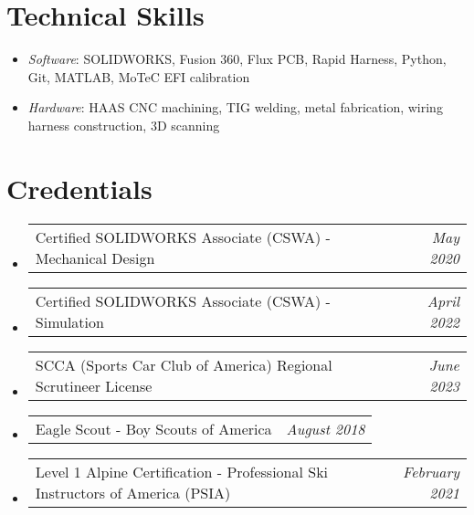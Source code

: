 \documentclass[letterpaper,11pt]{article}
\makeatletter
\newcommand{\role}[2]{
  \vspace{-5pt}\item
  \begin{tabular*}{1.0\textwidth}[t]{l@{\extracolsep{\fill}}r}
    \textit{\small#1} & \textit{\small #2} \\
  \end{tabular*}\vspace{-20pt}
}
\newcommand{\resumeItemListStart}{
  \begin{itemize}[label=\tiny$\bullet$, leftmargin=0.25in] %
}
\newcommand{\resumeItemListEnd}{
  \end{itemize}\vspace{-5pt}
}
\newcommand{\resumeItem}[1]{
  \item\small{#1 \vspace{-2pt}}
}
\newcommand{\credentialListStart}{
  \vspace{-4}
  \begin{itemize}[label=\tiny$\bullet$, leftmargin=0.25in] %
}
\newcommand{\credentialListEnd}{
  \end{itemize}\vspace{-5pt}
}
\newcommand{\credential}[2]{
  \item
  \begin{tabular*}{0.94\textwidth}[t]{l@{\extracolsep{\fill}}r}
    \textnormal{\small#1} & \textit{\small #2} \\
  \end{tabular*}\vspace{-8pt}
}
\makeatother
\begin{document}
            

\section{Technical Skills}
    \resumeItemListStart
        \resumeItem{\textit{Software}{: SOLIDWORKS, Fusion 360, Flux PCB, Rapid Harness, Python, Git, MATLAB, MoTeC EFI calibration}} \vspace{-5pt}
        \resumeItem{\textit{Hardware}{: HAAS CNC machining, TIG welding, metal fabrication, wiring harness construction, 3D scanning}}
    \resumeItemListEnd
 \vspace{-16pt}

\section{Credentials}
    \credentialListStart
        \credential{Certified SOLIDWORKS Associate (CSWA) - Mechanical Design}{May 2020}
        \credential{Certified SOLIDWORKS Associate (CSWA) - Simulation}{April 2022}
        \credential{SCCA (Sports Car Club of America) Regional Scrutineer License}{June 2023}
        \credential{Eagle Scout - Boy Scouts of America}{August 2018}
        \credential{Level 1 Alpine Certification - Professional Ski Instructors of America (PSIA) }{February 2021}
    \credentialListEnd
    
\end{document}
